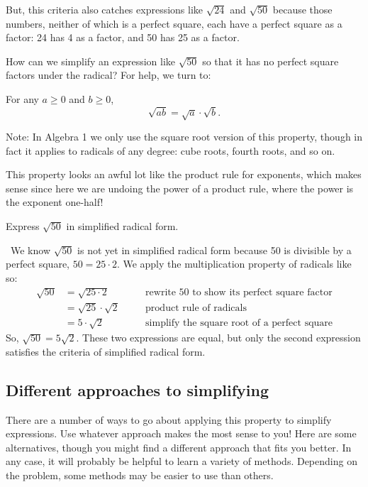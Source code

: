 But, this criteria also catches expressions like $\sqrt{24}$ and $\sqrt{50}$ because those numbers, neither of which is a perfect square, each have a perfect square as a factor: 24 has 4 as a factor, and 50 has 25 as a factor.

How can we simplify an expression like $\sqrt{50}$ so that it has no perfect square factors under the radical? For help, we turn to:

\begin{boxeddef}
For any $a \geq 0$ and $b \geq 0$, \[\sqrt{ab} = \sqrt{a} \cdot \sqrt{b}.\]

Note: In Algebra 1 we only use the square root version of this property, though in fact it applies to radicals of any degree: cube roots, fourth roots, and so on.
\end{boxeddef}

This property looks an awful lot like the product rule for exponents, which makes sense since here we are undoing the power of a product rule, where the power is the exponent one-half!

\begin{boxedex}
Express $\sqrt{50}$ in simplified radical form.

\exsoln\ We know $\sqrt{50}$ is not yet in simplified radical form because 50 is divisible by a perfect square, $50 = 25 \cdot 2$. We apply the multiplication property of radicals like so:
\[
\begin{aligned}
\sqrt{50} 	&= \sqrt{25 \cdot 2}
&& \quad \text{rewrite 50 to show its perfect square factor}\\
			&= \sqrt{25} \cdot \sqrt{2}
&& \quad \text{product rule of radicals}\\
			&= 5 \cdot \sqrt{2}
&& \quad \text{simplify the square root of a perfect square}
\end{aligned}
\]
So, $\sqrt{50} = 5\sqrt{2}$. These two expressions are equal, but only the second expression satisfies the criteria of simplified radical form.
\end{boxedex}

\subsection{Different approaches to simplifying}

There are a number of ways to go about applying this property to simplify expressions. Use whatever approach makes the most sense to you! Here are some alternatives, though you might find a different approach that fits you better. In any case, it will probably be helpful to learn a variety of methods. Depending on the problem, some methods may be easier to use than others.


